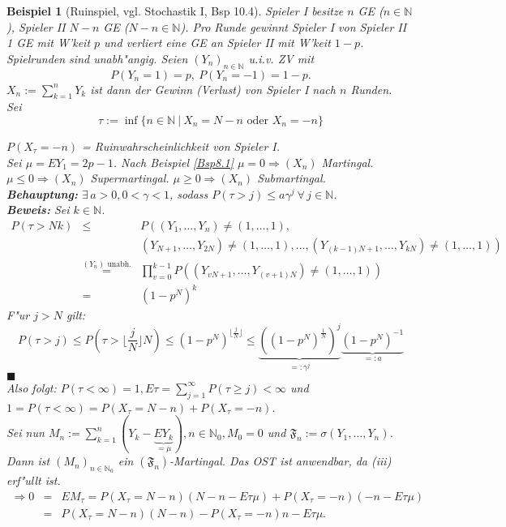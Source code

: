 \documentclass[a4paper,11pt]{scrbook}
\newcommand{\N}{{\mathbb N}}
\def\FF{ \mathfrak{F} }
\newtheorem{Bsp}{Beispiel}[chapter]
\theoremstyle{nonumberplain}
\begin{document}
\begin{Bsp}[Ruinspiel, vgl. Stochastik I, Bsp 10.4] \label{Bsp8.7}
Spieler I besitze $n$ GE ($n \in \N$), Spieler II $N-n$ GE ($N-n \in \N$). Pro Runde gewinnt Spieler I von Spieler II 1 GE mit W'keit $p$ und verliert eine GE an Spieler II mit W'keit $1-p$. Spielrunden sind unabh"angig. Seien $(Y_n)_{n \in \N}$ u.i.v. ZV mit
\[
P(Y_n = 1) = p,\ P(Y_n = -1) = 1-p.
\]
$X_n := \sum\limits_{k=1}^n Y_k$ ist dann der Gewinn (Verlust) von Spieler I nach $n$ Runden.\\
Sei
\[
\tau := \inf\{ n \in \N\ |\ X_n = N-n \text{ oder } X_n = -n \}
\]

$P(X_{\tau} = -n)$ = Ruinwahrscheinlichkeit von Spieler I.\\
Sei $\mu = EY_1 = 2p -1$. Nach Beispiel \ref{Bsp8.1} $\mu = 0 \Rightarrow (X_n)$ Martingal. $\mu \leq 0 \Rightarrow (X_n)$ Supermartingal. $\mu \geq 0 \Rightarrow (X_n)$ Submartingal.\\
\textbf{Behauptung:} $\exists\, a > 0, 0 < \gamma < 1$, sodass $P(\tau > j) \leq a \gamma^j \ \forall\, j \in \N$.\\
\textbf{Beweis:} Sei $k \in \N$.
\begin{eqnarray*}
P(\tau > Nk) & \leq & P\left( (Y_1,\dots,Y_n) \not= (1,\dots,1) , \right. \\
& & \left. (Y_{N+1},\dots,Y_{2N}) \not= (1,\dots,1) , \dots, (Y_{(k-1)N+1},\dots,Y_{kN}) \not= (1,\dots,1) \right) \\
& \stackrel{(Y_n) \text{ unabh.}}{=} & \prod_{v = 0}^{k-1} P\left( (Y_{vN+1},\dots,Y_{(v+1)N}) \not= (1,\dots,1) \right)\\
& = & (1-p^N)^k
\end{eqnarray*}
F"ur $j > N$ gilt:
\[
P(\tau > j) \leq P( \tau > \lfloor \frac{j}{N} \rfloor N) \leq (1-p^N)^{\lfloor \frac{j}{N} \rfloor} \leq \underbrace{\left( (1-p^N)^{\frac1{N}} \right)^j}_{=: \gamma^j} \underbrace{(1-p^N)^{-1}}_{=: a}
\]
\hfill $\blacksquare$ \\
Also folgt: $P(\tau < \infty) = 1, E\tau = \sum\limits_{j=1}^{\infty} P(\tau \geq j) < \infty$ und $1 = P(\tau < \infty) = P(X_{\tau} = N-n) + P(X_{\tau} = -n)$.\\
Sei nun $M_n := \sum\limits_{k=1}^n (Y_k - \underbrace{EY_k}_{=\mu}), n \in \N_0, M_0 = 0$ und $\FF_n := \sigma(Y_1,\dots,Y_n)$.\\
Dann ist $(M_n)_{n \in \N_0}$ ein $(\FF_n)$-Martingal. Das OST ist anwendbar, da (iii) erf"ullt ist.
\begin{eqnarray*}
\Rightarrow 0 & = & EM_{\tau} = P(X_{\tau} = N-n) (N-n-E\tau \mu) + P(X_{\tau} = -n)(-n-E\tau \mu) \\
& = & P(X_{\tau} = N-n)(N-n) - P(X_{\tau} = -n)n -E\tau \mu.
\end{eqnarray*}


\end{Bsp}
\end{document}
